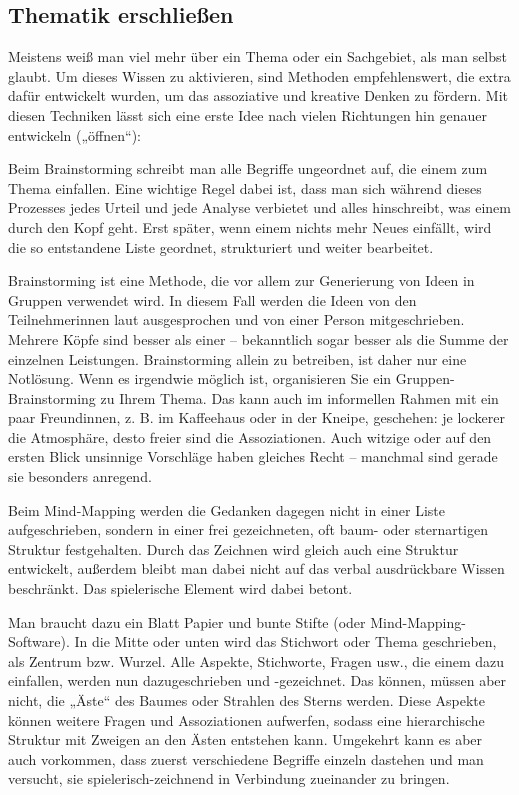 \documentclass[]{book}
\theoremstyle{definition}
\theoremstyle{definition}
\theoremstyle{definition}
\theoremstyle{remark}
\begin{document}
\subsection{Thematik erschließen}\label{thematik-erschlieen}

Meistens weiß man viel mehr über ein Thema oder ein Sachgebiet, als man
selbst glaubt. Um dieses Wissen zu aktivieren, sind Methoden
empfehlenswert, die extra dafür entwickelt wurden, um das assoziative
und kreative Denken zu fördern. Mit diesen Techniken lässt sich eine
erste Idee nach vielen Richtungen hin genauer entwickeln („öffnen``):

Beim Brainstorming schreibt man alle Begriffe ungeordnet auf, die einem
zum Thema einfallen. Eine wichtige Regel dabei ist, dass man sich
während dieses Prozesses jedes Urteil und jede Analyse verbietet und
alles hinschreibt, was einem durch den Kopf geht. Erst später, wenn
einem nichts mehr Neues einfällt, wird die so entstandene Liste
geordnet, strukturiert und weiter bearbeitet.

Brainstorming ist eine Methode, die vor allem zur Generierung von Ideen
in Gruppen verwendet wird. In diesem Fall werden die Ideen von den
Teilnehmerinnen laut ausgesprochen und von einer Person mitgeschrieben.
Mehrere Köpfe sind besser als einer -- bekanntlich sogar besser als die
Summe der einzelnen Leistungen. Brainstorming allein zu betreiben, ist
daher nur eine Notlösung. Wenn es irgendwie möglich ist, organisieren
Sie ein Gruppen-Brainstorming zu Ihrem Thema. Das kann auch im
informellen Rahmen mit ein paar Freundinnen, z. B. im Kaffeehaus oder in
der Kneipe, geschehen: je lockerer die Atmosphäre, desto freier sind die
Assoziationen. Auch witzige oder auf den ersten Blick unsinnige
Vorschläge haben gleiches Recht -- manchmal sind gerade sie besonders
anregend.

Beim Mind-Mapping werden die Gedanken dagegen nicht in einer Liste
aufgeschrieben, sondern in einer frei gezeichneten, oft baum- oder
sternartigen Struktur festgehalten. Durch das Zeichnen wird gleich auch
eine Struktur entwickelt, außerdem bleibt man dabei nicht auf das verbal
ausdrückbare Wissen beschränkt. Das spielerische Element wird dabei
betont.

Man braucht dazu ein Blatt Papier und bunte Stifte (oder
Mind-Mapping-Software). In die Mitte oder unten wird das Stichwort oder
Thema geschrieben, als Zentrum bzw. Wurzel. Alle Aspekte, Stichworte,
Fragen usw., die einem dazu einfallen, werden nun dazugeschrieben und
-gezeichnet. Das können, müssen aber nicht, die „Äste`` des Baumes oder
Strahlen des Sterns werden. Diese Aspekte können weitere Fragen und
Assoziationen aufwerfen, sodass eine hierarchische Struktur mit Zweigen
an den Ästen entstehen kann. Umgekehrt kann es aber auch vorkommen, dass
zuerst verschiedene Begriffe einzeln dastehen und man versucht, sie
spielerisch-zeichnend in Verbindung zueinander zu bringen.
\end{document}
